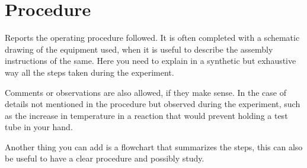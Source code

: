 \section{Procedure}
Reports the operating procedure followed. It is often completed with a schematic drawing of the equipment used, when it is useful to describe the assembly instructions of the same.
Here you need to explain in a synthetic but exhaustive way all the steps taken during the experiment.

Comments or observations are also allowed, if they make sense. In the case of details not mentioned in the procedure but observed during the experiment, such as the increase in temperature in a reaction that would prevent holding a test tube in your hand.



Another thing you can add is a flowchart that summarizes the steps, this can also be useful to have a clear procedure and possibly study.
